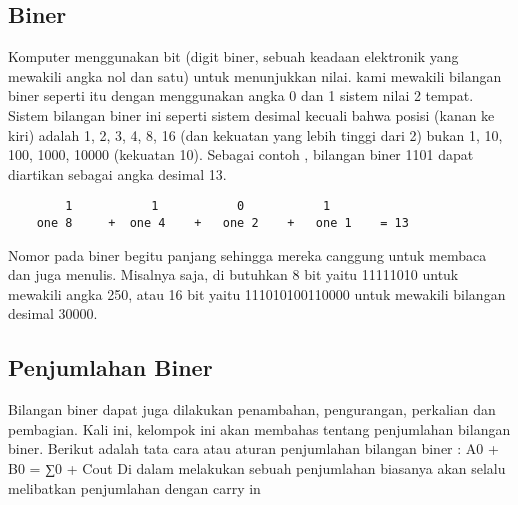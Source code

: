 \subsection {Biner}
Komputer menggunakan bit (digit biner, sebuah keadaan elektronik yang mewakili angka nol dan satu) untuk menunjukkan nilai. kami mewakili bilangan biner seperti itu dengan menggunakan angka 0 dan 1 sistem nilai 2 tempat. Sistem bilangan biner ini seperti sistem desimal kecuali bahwa posisi (kanan ke kiri) adalah 1, 2, 3, 4, 8, 16 (dan kekuatan yang lebih tinggi dari 2) bukan 1, 10, 100, 1000, 10000 (kekuatan 10). Sebagai contoh , bilangan biner 1101 dapat diartikan sebagai angka desimal 13.
\begin{verbatim}
		1			1			0			1
	one 8	  +	 one 4	  +	  one 2    +   one 1 	= 13
	\end{verbatim}
Nomor pada  biner begitu panjang sehingga mereka canggung  untuk membaca dan juga menulis. Misalnya saja, di butuhkan 8 bit yaitu  11111010 untuk mewakili angka 250, atau 16 bit yaitu 111010100110000 untuk mewakili bilangan desimal 30000.


\subsection {Penjumlahan Biner}
Bilangan biner dapat juga dilakukan penambahan, pengurangan, perkalian dan pembagian. Kali ini, kelompok ini akan membahas tentang penjumlahan bilangan biner. Berikut adalah tata cara atau aturan penjumlahan bilangan biner :
A0 + B0 = ∑0 + Cout
Di dalam melakukan sebuah penjumlahan biasanya akan selalu melibatkan penjumlahan dengan carry in
